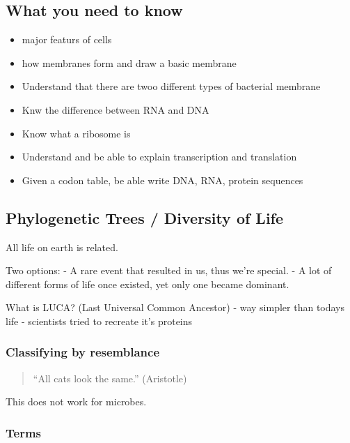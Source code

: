 \hypertarget{what-you-need-to-know-1}{%
\subsection{What you need to know}\label{what-you-need-to-know-1}}

\begin{itemize}
\tightlist
\item
  major featurs of cells
\item
  how membranes form and draw a basic membrane
\item
  Understand that there are twoo different types of bacterial membrane
\item
  Knw the difference between RNA and DNA
\item
  Know what a ribosome is
\item
  Understand and be able to explain transcription and translation
\item
  Given a codon table, be able write DNA, RNA, protein sequences
\end{itemize}

\hypertarget{phylogenetic-trees-diversity-of-life}{%
\subsection{Phylogenetic Trees / Diversity of
Life}\label{phylogenetic-trees-diversity-of-life}}

All life on earth is related.

Two options: - A rare event that resulted in us, thus we're special. - A
lot of different forms of life once existed, yet only one became
dominant.

What is LUCA? (Last Universal Common Ancestor) - way simpler than todays
life - scientists tried to recreate it's proteins

\hypertarget{classifying-by-resemblance}{%
\subsubsection{Classifying by
resemblance}\label{classifying-by-resemblance}}

\begin{quote}
``All cats look the same.'' (Aristotle)
\end{quote}

This does not work for microbes.

\hypertarget{terms}{%
\subsubsection{Terms}\label{terms}}

